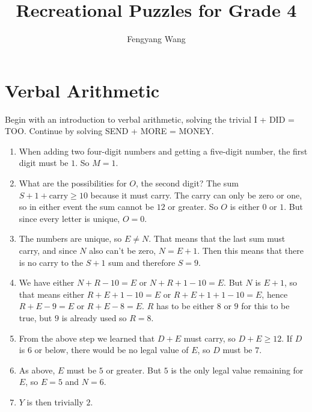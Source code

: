 \documentclass[a4paper,10pt]{report}
\title{Recreational Puzzles for Grade 4}
\author{Fengyang Wang}
\begin{document}
\maketitle

\chapter{Verbal Arithmetic}

Begin with an introduction to verbal arithmetic, solving the trivial I + DID =
TOO. Continue by solving SEND + MORE = MONEY.

\begin{enumerate}
 \item When adding two four-digit numbers and getting a five-digit number, the
 first digit must be $1$. So $M=1$.
 \item What are the possibilities for $O$, the second digit? The sum
 $S+1+\text{carry} \ge 10$ because it must carry. The carry can only be zero or
 one, so in either event the sum cannot be $12$ or greater. So $O$ is either $0$
 or $1$. But since every letter is unique, $O=0$.
 \item The numbers are unique, so $E \ne N$. That means that the last sum must
 carry, and since $N$ also can't be zero, $N = E + 1$. Then this means that
 there is no carry to the $S+1$ sum and therefore $S = 9$.
 \item We have either $N+R-10=E$ or $N+R+1-10=E$. But $N$ is $E+1$, so that
 means either $R+E+1-10=E$ or $R+E+1+1-10=E$, hence $R+E-9=E$ or $R+E-8=E$. $R$
 has to be either $8$ or $9$ for this to be true, but $9$ is already used so
 $R=8$.
 \item From the above step we learned that $D+E$ must carry, so $D+E \ge 12$. If
 $D$ is $6$ or below, there would be no legal value of $E$, so $D$ must be $7$.
 \item As above, $E$ must be $5$ or greater. But $5$ is the only legal value
 remaining for $E$, so $E=5$ and $N=6$.
 \item $Y$ is then trivially $2$.
\end{enumerate}
\end{document}
